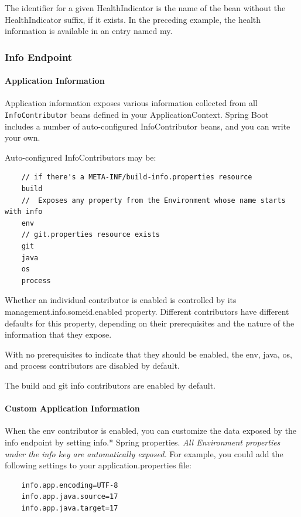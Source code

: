 \documentclass{scrartcl}
\begin{document}
The identifier for a given HealthIndicator is the name of the bean without the HealthIndicator suffix, if it exists. In the preceding example, the health information is available in an entry named my.

\subsubsection{Info Endpoint}
\paragraph{Application Information}

Application information exposes various information collected from all \lstinline|InfoContributor| beans defined in your ApplicationContext. Spring Boot includes a number of auto-configured InfoContributor beans, and you can write your own.

Auto-configured InfoContributors may be:

\begin{lstlisting}
    // if there's a META-INF/build-info.properties resource
    build
    //  Exposes any property from the Environment whose name starts with info
    env
    // git.properties resource exists
    git
    java
    os
    process
\end{lstlisting}

Whether an individual contributor is enabled is controlled by its management.info.someid.enabled property.
Different contributors have different defaults for this property, depending on their prerequisites and the nature of the information that they expose.

With no prerequisites to indicate that they should be enabled, the env, java, os, and process contributors are disabled by default.

The build and git info contributors are enabled by default.

\paragraph{Custom Application Information}

When the env contributor is enabled, you can customize the data exposed by the info endpoint by setting info.* Spring properties. \textit{All Environment properties under the info key are automatically exposed.} For example, you could add the following settings to your application.properties file:

    \begin{lstlisting}
    info.app.encoding=UTF-8
    info.app.java.source=17
    info.app.java.target=17

    \end{lstlisting}
\end{document}
